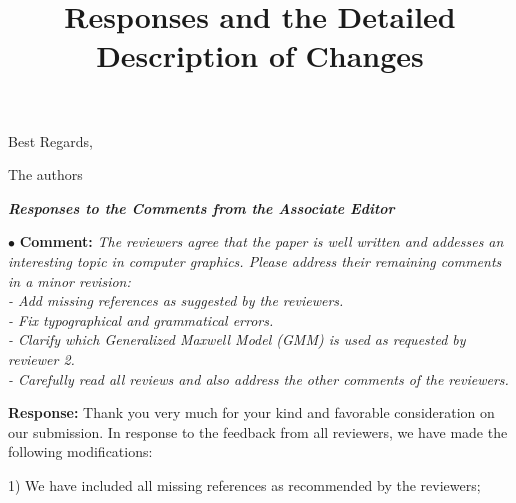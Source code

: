 \documentclass[12pt,a4paper]{article}
\begin{document}
\bigskip

\noindent Best Regards,


\bigskip

\noindent The authors

\bigskip
\bigskip
\bigskip

\newpage



\newsavebox\CBox
\def\textBF#1{\sbox\CBox{#1}\resizebox{\wd\CBox}{\ht\CBox}{\textbf{#1}}}
\title{\Large\textbf{ Responses and the Detailed Description of Changes}}
\date{}
\author{}
\maketitle

\vspace{-1.5cm}
\begin{flushleft}
	\textit{\textbf{Responses to the Comments from the Associate Editor}}
\end{flushleft}


\vspace{0.4cm}
\noindent$\bullet$ \enspace \textbf{Comment:}
\textit{The reviewers agree that the paper is well written and addesses an interesting topic in computer graphics. Please address their remaining comments in a minor revision:\\
- Add missing references as suggested by the reviewers.\\
- Fix typographical and grammatical errors.\\
- Clarify which Generalized Maxwell Model (GMM) is used as requested by reviewer 2.\\
- Carefully read all reviews and also address the other comments of the reviewers.}

\vspace{0.2cm}
\textbf{Response:}
Thank you very much for your kind and favorable consideration on our submission. In response to the feedback from all reviewers, we have made the following modifications: 

1) We have included all missing references as recommended by the reviewers; 
\end{document}

